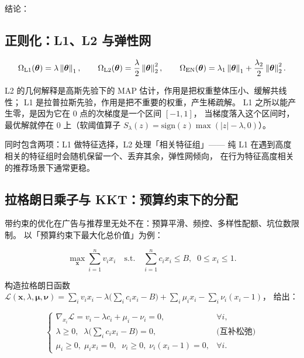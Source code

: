 结论：

\subsection{正则化：L1、L2 与弹性网}

\begin{equation}
\Omega_{\text{L1}}(\bm{\theta}) = \lambda\left\lVert \bm{\theta} \right\rVert_1,
\qquad
\Omega_{\text{L2}}(\bm{\theta}) = \frac{\lambda}{2}\left\lVert \bm{\theta} \right\rVert_2^2,
\qquad
\Omega_{\text{EN}}(\bm{\theta}) = \lambda_1\left\lVert \bm{\theta} \right\rVert_1 + \frac{\lambda_2}{2}\left\lVert \bm{\theta} \right\rVert_2^2 .
\label{eq:reg}
\end{equation}

L2 的几何解释是高斯先验下的 MAP 估计，作用是把权重整体压小、缓解共线性；
L1 是拉普拉斯先验，作用是把不重要的权重，产生稀疏解。
L1 之所以能产生零，是因为它在 0 点的次梯度是一个区间 $[-1,1]$，
当梯度落入这个区间时，最优解就停在 0 上（软阈值算子
$S_\lambda(z) = \text{sign}(z)\max(|z|-\lambda, 0)$）。

 同时包含两项：L1 做特征选择，L2 处理「相关特征组」——
纯 L1 在遇到高度相关的特征组时会随机保留一个、丢弃其余，弹性网倾向，
在行为特征高度相关的推荐场景下通常更稳。

\subsection{拉格朗日乘子与 KKT：预算约束下的分配}

带约束的优化在广告与推荐里无处不在：预算平滑、频控、多样性配额、坑位数限制。
以「预算约束下最大化总价值」为例：

\begin{equation}
\max_{\bm{x}} \sum_{i=1}^{n} v_i x_i
\quad \text{s.t.} \quad
\sum_{i=1}^{n} c_i x_i \le B, \;\; 0 \le x_i \le 1 .
\label{eq:budget-primal}
\end{equation}

构造拉格朗日函数 $\mathcal{L}(\bm{x},\lambda,\bm{\mu},\bm{\nu}) = \sum_i v_i x_i
- \lambda\big(\sum_i c_i x_i - B\big) + \sum_i \mu_i x_i - \sum_i \nu_i (x_i - 1)$，
 给出：

\begin{equation}
\begin{cases}
\nabla_{x_i}\mathcal{L} = v_i - \lambda c_i + \mu_i - \nu_i = 0, & \forall i, \\
\lambda \ge 0, \;\; \lambda\Big(\sum_i c_i x_i - B\Big) = 0, & \text{(互补松弛)} \\
\mu_i \ge 0,\; \mu_i x_i = 0, \;\; \nu_i \ge 0,\; \nu_i(x_i-1) = 0, & \forall i .
\end{cases}
\label{eq:kkt}
\end{equation}

